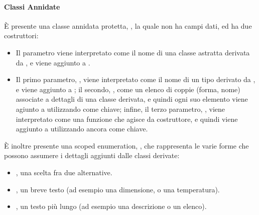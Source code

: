 \paragraph{Classi Annidate} %
\label{par:classi_annidate}
È presente una classe annidata protetta, , la quale non ha campi dati, ed ha due costruttori:
\begin{itemize}
 	\item {}\newline
 	Il parametro viene interpretato come il nome di una classe astratta derivata da , e viene aggiunto a .
	\item {}\newline
	\newline
	\newline
	Il primo parametro, , viene interpretato come il nome di un tipo derivato da , e viene aggiunto a ; il secondo, , come un elenco di coppie (forma, nome) associate a dettagli di una classe derivata, e quindi ogni suo elemento viene agiunto a  utilizzando  come chiave; infine, il terzo parametro, , viene interpretato come una funzione che agisce da costruttore, e quindi viene aggiunto a  utilizzando ancora  come chiave.
\end{itemize}
È inoltre presente una scoped enumeration, , che rappresenta le varie forme che possono assumere i dettagli aggiunti dalle classi derivate:
\begin{itemize}
	\item {}, una scelta fra due alternative.
	\item {}, un breve testo (ad esempio una dimensione, o una temperatura).
	\item {}, un testo più lungo (ad esempio una descrizione o un elenco).
\end{itemize}
